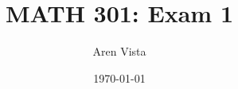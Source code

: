 \documentclass[11pt]{article}
\title{ MATH 301: Exam 1}
\author{ Aren Vista }
\date{\today}
\theoremstyle{plain}
\begin{document}
 \maketitle \pagebreak
\end{document}
